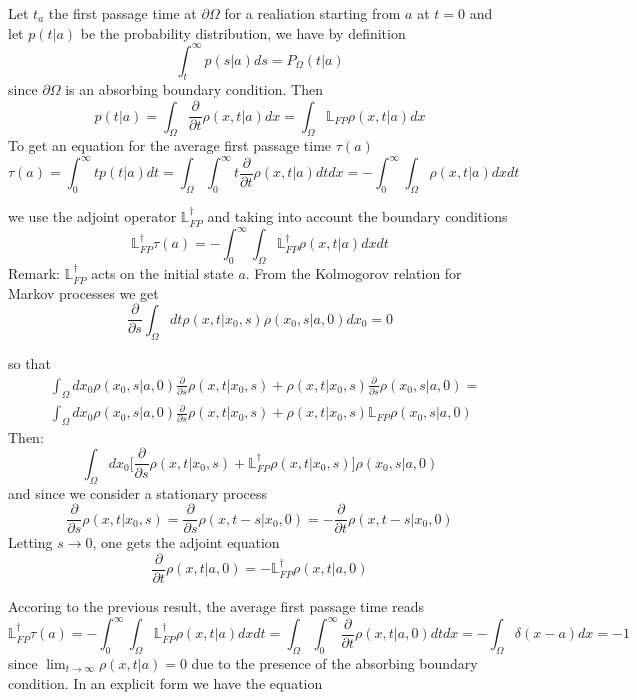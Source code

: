 Let $t_a$ the first passage time at $\partial \Omega$ for a realiation starting from $a$ at $t=0$ and let $p(t|a)$ be the probability distribution, we have by definition 
$$
\int_t^{\infty} p(s|a)ds = P_\Omega(t|a)
$$
since $\partial \Omega$ is an absorbing boundary condition. Then
$$
p(t|a) = \int_{\Omega} \frac{\partial}{\partial t} \rho (x,t|a)dx = \int_{\Omega} \mathbb{L}_{FP} \rho(x,t|a)dx
$$
To get an equation for the average first passage time $\tau(a)$
$$
\tau(a) = \int_{0}^{\infty} t p(t|a) dt = \int_{\Omega}\int_{0}^{\infty} t \frac{\partial}{\partial t} \rho(x,t|a)dt dx = - \int_{0}^{\infty} \int_\Omega \rho(x,t|a)dx dt
$$

we use the adjoint operator $\mathbb{L}_{FP}^{\dagger}$ and taking into account the boundary conditions 
$$
\mathbb{L}_{FP}^{\dagger} \tau(a) = -\int_{0}^{\infty}\int_{\Omega} \mathbb{L}_{FP}^{\dagger} \rho(x,t|a)dx dt
$$
Remark: $\mathbb{L}_{FP}^{\dagger}$ acts on the initial state $a$. From the Kolmogorov relation for Markov processes we get 
$$
\frac{\partial}{\partial s} \int_{\Omega} dt \rho(x,t|x_0,s)\rho(x_0,s|a,0)dx_0 = 0
$$

so that 
\begin{equation}
\begin{split}
& \int_{\Omega} dx_0 \rho(x_0,s|a,0)\frac{\partial}{\partial s} \rho(x,t|x_0,s) + 
\rho(x,t|x_0,s) \frac{\partial}{\partial s} \rho(x_0,s|a,0)
  = \\ 
& \int_{\Omega} dx_0 \rho(x_0,s|a,0)  \frac{\partial}{\partial s} \rho(x,t|x_0,s) + 
 \rho(x,t|x_0,s) \mathbb{L}_{FP} \rho(x_0,s|a,0)
\end{split}
\end{equation}
Then:
$$
\int_{\Omega} dx_0 \biggl[ \frac{\partial}{\partial s} \rho(x,t|x_0,s) + \mathbb{L}_{FP}^{\dagger} \rho (x,t|x_0,s) \biggr] \rho(x_0,s|a,0) 
$$
and since we consider a stationary process 
$$
\frac{\partial}{\partial s} \rho(x,t|x_0,s) = \frac{\partial}{\partial s} \rho (x,t -s|x_0,0) = - \frac{\partial}{\partial t} \rho(x,t-s|x_0,0)
$$
Letting $s \to 0$, one gets the adjoint equation
$$
\frac{\partial}{\partial t } \rho(x,t|a,0) = - \mathbb{L}_{FP}^{\dagger} \rho(x,t|a,0)
$$

Accoring to the previous result, the average first passage time reads
$$
\mathbb{L}_{FP}^{\dagger} \tau(a) = - \int_{0}^{\infty} \int_{\Omega} \mathbb{L}_{FP}^{\dagger} \rho(x,t|a)dx dt = \int_{\Omega}\int_{0}^{\infty} \frac{\partial}{\partial t} \rho(x,t|a,0)dt dx = - \int _{\Omega} \delta (x-a ) dx = -1
$$
 since $\lim_{t \to \infty} \rho(x,t|a) = 0 $ due to the presence of the absorbing boundary condition.
In an explicit form we have the equation 

